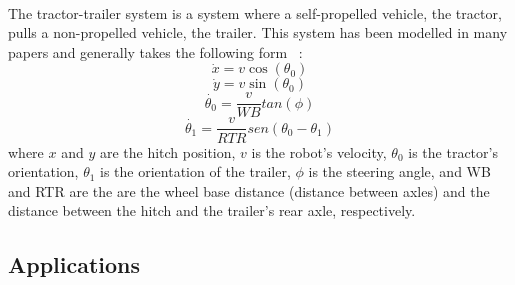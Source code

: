 \paragraph{}The tractor-trailer system is a system where a self-propelled vehicle, the tractor, pulls a 
non-propelled vehicle, the trailer. This system has been modelled in many papers and generally takes the 
following form ~\cite{theman, ttdynamics2}:
\begin{equation}
    \dot{x} = v \cos(\theta_0)
\end{equation}
\begin{equation}
    \dot{y} = v \sin(\theta_0)
\end{equation}
\begin{equation}
    \dot{\theta_0} = \frac{v}{WB}tan(\phi)
\end{equation}
\begin{equation}
    \dot{\theta_1} = \frac{v}{RTR}sen(\theta_0-\theta_1)
\end{equation}
where $x$ and $y$ are the hitch position, $v$ is the robot's velocity, 
$\theta_0$ is the tractor's orientation, $\theta_1$ is the orientation of the trailer, $\phi$ is the 
steering angle, and WB and RTR are the are the wheel base distance (distance between axles) 
and the distance between the hitch and the trailer's rear axle, respectively.

\subsection{Applications}
\label{subsec:APP}
